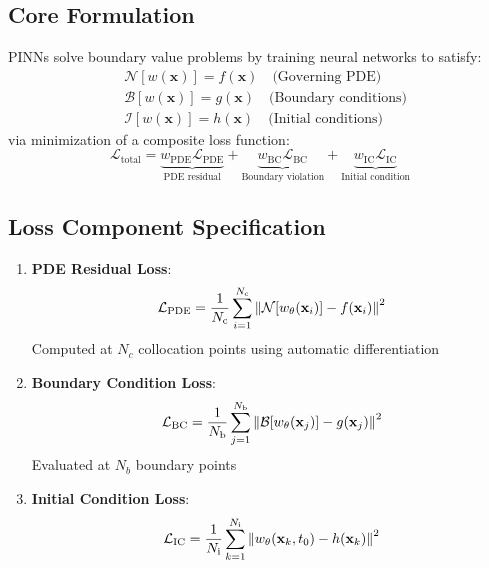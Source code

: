\documentclass[12pt]{article}
\begin{document}
\subsection{Core Formulation}
PINNs solve boundary value problems by training neural networks to satisfy:
\begin{align}
	&\mathcal{N}[w(\mathbf{x})] = f(\mathbf{x}) \quad \text{(Governing PDE)} \nonumber \\
	&\mathcal{B}[w(\mathbf{x})] = g(\mathbf{x}) \quad \text{(Boundary conditions)} \nonumber \\
	&\mathcal{I}[w(\mathbf{x})] = h(\mathbf{x}) \quad \text{(Initial conditions)} \nonumber
\end{align}
via minimization of a composite loss function:
\begin{equation}
	\mathcal{L}_{\text{total}} = \underbrace{w_{\text{PDE}} \mathcal{L}_{\text{PDE}}}_{\text{PDE residual}} + 
	\underbrace{w_{\text{BC}} \mathcal{L}_{\text{BC}}}_{\text{Boundary violation}} + 
	\underbrace{w_{\text{IC}} \mathcal{L}_{\text{IC}}}_{\text{Initial condition}}
	\label{eq:total_loss}
\end{equation}

\subsection{Loss Component Specification}
\begin{enumerate}
	\item \textbf{PDE Residual Loss}:
	\begin{equation}
		\mathcal{L}_{\text{PDE}} = \frac{1}{N_{\text{c}}} \sum_{i=1}^{N_{\text{c}}} \norm{\mathcal{N}[w_{\theta}(\mathbf{x}_i)] - f(\mathbf{x}_i)}^2
		\label{eq:pde_loss}
	\end{equation}
	Computed at $N_c$ collocation points using automatic differentiation
	
	\item \textbf{Boundary Condition Loss}:
	\begin{equation}
		\mathcal{L}_{\text{BC}} = \frac{1}{N_{\text{b}}} \sum_{j=1}^{N_{\text{b}}} \norm{\mathcal{B}[w_{\theta}(\mathbf{x}_j)] - g(\mathbf{x}_j)}^2
		\label{eq:bc_loss}
	\end{equation}
	Evaluated at $N_b$ boundary points
	
	\item \textbf{Initial Condition Loss}:
	\begin{equation}
		\mathcal{L}_{\text{IC}} = \frac{1}{N_{\text{i}}} \sum_{k=1}^{N_{\text{i}}} \norm{w_{\theta}(\mathbf{x}_k, t_0) - h(\mathbf{x}_k)}^2
		\label{eq:ic_loss}
	\end{equation}
\end{enumerate}
\end{document}
